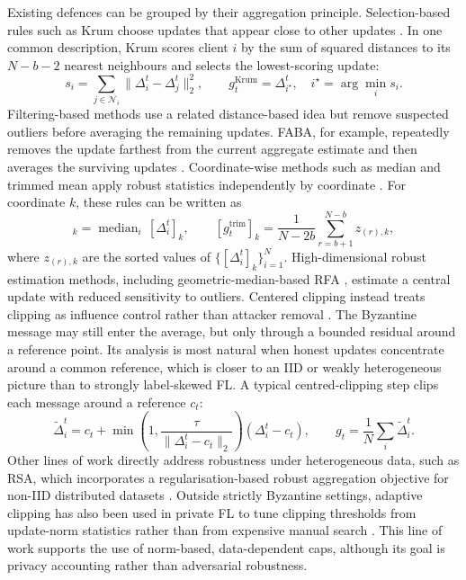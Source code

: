 Existing defences can be grouped by their aggregation principle. Selection-based
rules such as Krum choose updates that appear close to other updates
\cite{NIPS2017_f4b9ec30}. In one common description, Krum scores client \(i\)
by the sum of squared distances to its \(N-b-2\) nearest neighbours and selects
the lowest-scoring update:
\begin{equation}
    s_i=\sum_{j\in \mathcal{N}_i}\|\Delta_i^t-\Delta_j^t\|_2^2,
    \qquad
    g_t^{\mathrm{Krum}}=\Delta_{i^\star}^t,\quad
    i^\star=\arg\min_i s_i .
    \label{eq:related-krum}
\end{equation}
Filtering-based methods use a related distance-based idea but remove suspected
outliers before averaging the remaining updates. FABA, for example, repeatedly
removes the update farthest from the current aggregate estimate and then
averages the surviving updates \cite{xia2019faba}.
Coordinate-wise methods such as median and trimmed mean apply robust statistics
independently by coordinate \cite{pmlr-v80-yin18a}. For coordinate \(k\), these
rules can be written as
\begin{equation}
    [g_t^{\mathrm{med}}]_k
    = \operatorname{median}_{i}\,[\Delta_i^t]_k,
    \qquad
    [g_t^{\mathrm{trim}}]_k
    = \frac{1}{N-2b}\sum_{r=b+1}^{N-b} z_{(r),k},
    \label{eq:related-median-trimmed}
\end{equation}
where \(z_{(r),k}\) are the sorted values of
\(\{[\Delta_i^t]_k\}_{i=1}^{N}\).
High-dimensional robust estimation methods, including geometric-median-based
RFA \cite{Pillutla_2022}, estimate a central update with reduced sensitivity to
outliers. Centered clipping instead treats clipping as influence control rather
than attacker removal \cite{pmlr-v139-karimireddy21a}. The Byzantine message may
still enter the average, but only through a bounded residual around a reference
point. Its analysis is most natural when honest updates concentrate around a
common reference, which is closer to an IID or weakly heterogeneous picture
than to strongly label-skewed FL. A typical centred-clipping step clips each
message around a reference \(c_t\):
\begin{equation}
    \tilde{\Delta}_i^t
    = c_t + \min\!\left(1,\frac{\tau}{\|\Delta_i^t-c_t\|_2}\right)
      (\Delta_i^t-c_t),
    \qquad
    g_t=\frac{1}{N}\sum_i \tilde{\Delta}_i^t .
    \label{eq:related-cc}
\end{equation}
Other lines of work directly address robustness under heterogeneous data, such
as RSA, which incorporates a regularisation-based robust aggregation objective
for non-IID distributed datasets \cite{li2019rsa}.
Outside strictly Byzantine settings, adaptive clipping has also been used in
private FL to tune clipping thresholds from update-norm statistics rather than
from expensive manual search \cite{andrew2021adaptiveclipping}. This line of
work supports the use of norm-based, data-dependent caps, although its goal is
privacy accounting rather than adversarial robustness.

